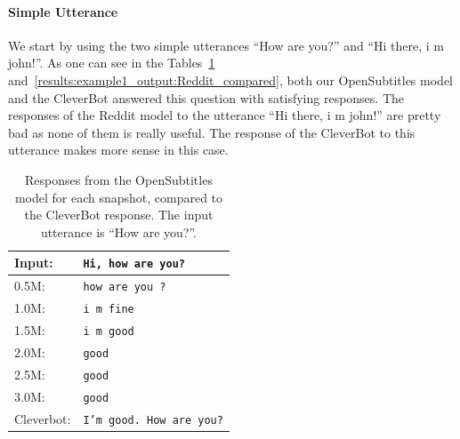 \paragraph{Simple Utterance} We start by using the two simple utterances ``How are you?'' and ``Hi there, i m john!''. As one can see in the Tables~\ref{results:example1_output:OpenSubtitle_compared} and~\ref{results:example1_output:Reddit_compared}, both our OpenSubtitles model and the CleverBot answered this question with satisfying responses. The responses of the Reddit model to the utterance ``Hi there, i m john!'' are pretty bad as none of them is really useful. The response of the CleverBot to this utterance makes more sense in this case.
\\
\begin{table}[H]
	\centering
	\begin{adjustbox}{max width=\textwidth}
		\begin{tabular}{ll}
			\toprule
			Input: 	& \texttt{Hi, how are you?}\\
			\midrule
			0.5M: 	& \texttt{how are you ?}\\
			1.0M: 	& \texttt{i m fine}\\
			1.5M:	& \texttt{i m good}\\
			2.0M:	& \texttt{good}\\
			2.5M:	& \texttt{good}\\
			3.0M:	& \texttt{good}\\
			Cleverbot:	& \texttt{I'm good. How are you?}\\
			\bottomrule
		\end{tabular}
	\end{adjustbox}
\caption{Responses from the OpenSubtitles model for each snapshot, compared to the CleverBot response. The input utterance is ``How are you?''.}
\label{results:example1_output:OpenSubtitle_compared}

\end{table}
